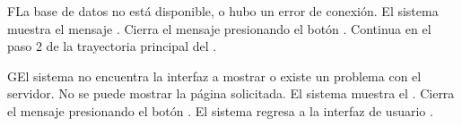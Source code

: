 
\begin{UCtrayectoriaA}{F}{La base de datos no está disponible, o hubo un error de conexión.}
	\UCpaso El sistema muestra el mensaje .
	\UCpaso[\UCactor] Cierra el mensaje presionando el botón .
	\UCpaso Continua en el paso 2 de la trayectoria principal del .
\end{UCtrayectoriaA}


\begin{UCtrayectoriaA}{G}{El sistema no encuentra la interfaz a mostrar o existe un problema con el servidor.}
	\UCpaso No se puede mostrar la página solicitada.
	\UCpaso El sistema muestra el .
	\UCpaso[\UCactor] Cierra el mensaje presionando el botón .
	\UCpaso El sistema regresa a la interfaz de usuario .
\end{UCtrayectoriaA}



